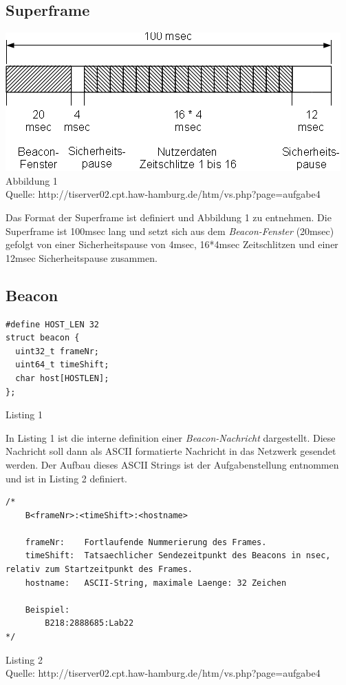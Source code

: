 \documentclass{article}
\begin{document}
\subsection{Superframe}
\begin{center}
\includegraphics[scale=.5]{Documents/frameformat.png}\\
\tiny Abbildung 1\\
\tiny Quelle: http://tiserver02.cpt.haw-hamburg.de/htm/vs.php?page=aufgabe4
\end{center}
Das Format der Superframe ist definiert und Abbildung 1 zu entnehmen. Die Superframe ist 100msec lang und setzt sich aus dem \textit{Beacon-Fenster} (20msec) gefolgt von einer Sicherheitspause von 4msec, 16*4msec Zeitschlitzen und einer 12msec Sicherheitspause zusammen.

\subsection{Beacon}
\begin{center}
\begin{lstlisting}
#define HOST_LEN 32
struct beacon {
  uint32_t frameNr;
  uint64_t timeShift;
  char host[HOSTLEN];
};
\end{lstlisting}
\tiny Listing 1\\
\end{center}
In Listing 1 ist die interne definition einer \textit{Beacon-Nachricht} dargestellt. Diese Nachricht soll dann als ASCII formatierte Nachricht in das Netzwerk gesendet werden. Der Aufbau dieses ASCII Strings ist der Aufgabenstellung entnommen und ist in Listing 2 definiert.
\begin{center}
\begin{lstlisting}
/*
	B<frameNr>:<timeShift>:<hostname>

    frameNr:    Fortlaufende Nummerierung des Frames.
    timeShift:  Tatsaechlicher Sendezeitpunkt des Beacons in nsec, relativ zum Startzeitpunkt des Frames.
    hostname:   ASCII-String, maximale Laenge: 32 Zeichen

    Beispiel:
        B218:2888685:Lab22
*/
\end{lstlisting}
\tiny Listing 2\\
\tiny Quelle: http://tiserver02.cpt.haw-hamburg.de/htm/vs.php?page=aufgabe4
\end{center}
\end{document}
